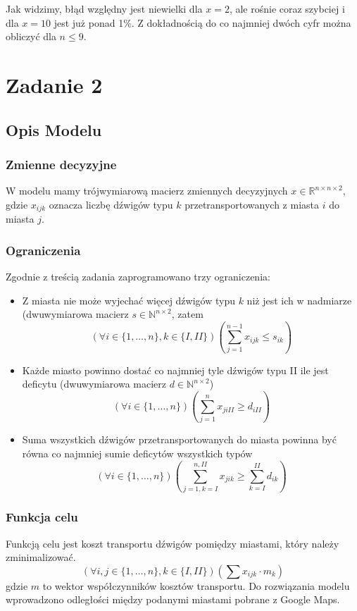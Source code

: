 \documentclass{article}
\begin{document}
Jak widzimy, błąd względny jest niewielki dla $x=2$, ale rośnie coraz szybciej i dla $x=10$ jest już ponad 1\%. Z dokładnością do co najmniej dwóch cyfr można obliczyć dla $n \leq 9$.

\section{Zadanie 2}
\subsection{Opis Modelu}
\subsubsection{Zmienne decyzyjne}
W modelu mamy trójwymiarową macierz zmiennych decyzyjnych $x \in \mathbb{R}^{n\times n\times 2}$, gdzie $x_{ijk}$ oznacza liczbę dźwigów typu $k$ przetransportowanych z miasta $i$ do miasta $j$.
\subsubsection{Ograniczenia}
Zgodnie z treścią zadania zaprogramowano trzy ograniczenia:
\begin{itemize}
	\item Z miasta nie może wyjechać więcej dźwigów typu $k$ niż jest ich w nadmiarze (dwuwymiarowa macierz $s \in \mathbb{N}^{n\times 2}$, zatem
	\[(\forall i \in \{1,\dots,n\}, k \in \{I,II\}) \left(\sum_{j=1}^{n-1}{x_{ijk} \leq s_{ik}}\right)\]
	\item Każde miasto powinno dostać co najmniej tyle dźwigów typu II ile jest deficytu (dwuwymiarowa macierz $d \in \mathbb{N}^{n\times 2}$)
	\[(\forall i \in \{1,\dots,n\}) \left(\sum_{j=1}^{n}{x_{jiII} \geq d_{iII}}\right)\]
	\item Suma wszystkich dźwigów przetransportowanych do miasta powinna być równa co najmniej sumie deficytów wszystkich typów
	\[(\forall i \in \{1,\dots,n\}) \left(\sum_{j=1,k=I}^{n,II}{x_{jik}} \geq \sum_{k=I}^{II}{d_{ik}}\right)\]
\end{itemize}
\subsubsection{Funkcja celu}
Funkcją celu jest koszt transportu dźwigów pomiędzy miastami, który należy zminimalizować. 
\[(\forall i,j \in \{1,\dots,n\}, k \in \{I,II\}) \left(\sum{x_{ijk} \cdot m_k}\right)\]
gdzie $m$ to wektor współczynników kosztów transportu.
Do rozwiązania modelu wprowadzono odległości między podanymi miastami pobrane z Google Maps.
\end{document}
